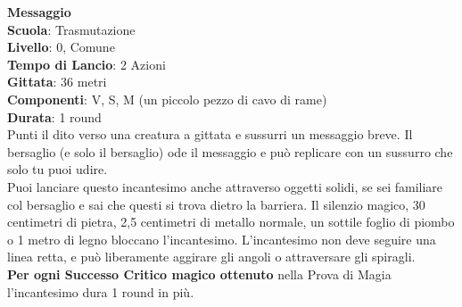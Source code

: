 \begin{multicols}{2}
\medskip\textbf{Messaggio}\\
\textbf{Scuola}: Trasmutazione\\
\textbf{Livello}: 0, Comune\\
\textbf{Tempo di Lancio}: 2 Azioni\\
\textbf{Gittata}: 36 metri\\
\textbf{Componenti}: V, S, M (un piccolo pezzo di cavo di rame)\\
\textbf{Durata}: 1 round\\
Punti il dito verso una creatura a gittata e sussurri un messaggio breve. Il bersaglio (e solo il bersaglio) ode il messaggio e può replicare con un sussurro che solo tu puoi udire.\\
Puoi lanciare questo incantesimo anche attraverso oggetti solidi, se sei familiare col bersaglio e sai che questi si trova dietro la barriera. Il silenzio magico, 30 centimetri di pietra, 2,5 centimetri di metallo normale, un sottile foglio di piombo o 1 metro di legno bloccano l'incantesimo. L'incantesimo non deve seguire una linea retta, e può liberamente aggirare gli angoli o attraversare gli spiragli.\\
\textbf{Per ogni Successo Critico magico ottenuto} nella Prova di Magia l'incantesimo dura 1 round in più.


\end{multicols}

